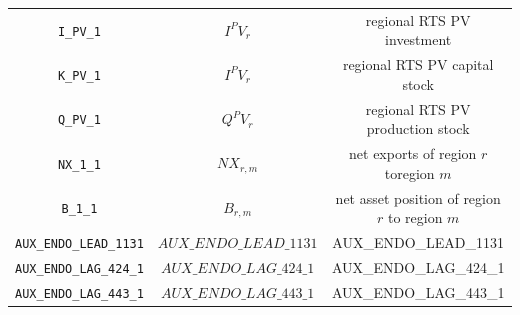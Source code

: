 \begin{center}
\begin{longtable}{ccc}
\texttt{I\_PV\_1} & ${I^PV_r}$ & regional RTS PV investment\\
\texttt{K\_PV\_1} & ${I^PV_r}$ & regional RTS PV capital stock\\
\texttt{Q\_PV\_1} & ${Q^PV_r}$ & regional RTS PV production stock\\
\texttt{NX\_1\_1} & ${NX_{r,m}}$ & net exports of region $r$toregion $m$\\
\texttt{B\_1\_1} & ${B_{r,m}}$ & net asset position of region $r$ to region $m$\\
\texttt{AUX\_ENDO\_LEAD\_1131} & $AUX\_ENDO\_LEAD\_1131$ & AUX\_ENDO\_LEAD\_1131\\
\texttt{AUX\_ENDO\_LAG\_424\_1} & $AUX\_ENDO\_LAG\_424\_1$ & AUX\_ENDO\_LAG\_424\_1\\
\texttt{AUX\_ENDO\_LAG\_443\_1} & $AUX\_ENDO\_LAG\_443\_1$ & AUX\_ENDO\_LAG\_443\_1\\
\hline%
\end{longtable}
\end{center}
